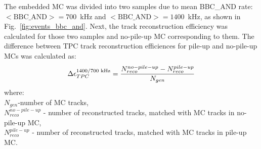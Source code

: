 \noindent The embedded MC was divided into two samples due to mean BBC\_AND rate: \mbox{$<\text{BBC\_AND}>=700$~kHz} and \mbox{$<\text{BBC\_AND}>=1400$~kHz}, as shown in Fig.~\ref{fig:events_bbc_and}. Next, the track reconstruction efficiency was calculated for those two samples and no-pile-up MC corresponding to them. The difference between TPC track reconstruction efficiences for pile-up and no-pile-up MCs was calculated as:
\begin{equation}
	\Delta\epsilon_{ TPC}^{1400/700\text{ kHz}} = \frac{N_{reco}^{no-pile-up}-N_{reco}^{pile-up}}{N_{gen}}\\
	\label{eq:tpcSyst}
\end{equation}
where:\\
$N_{gen}$-number of MC tracks,\\
$N_{reco}^{no-pile-up}$ - number of reconstructed tracks, matched with MC tracks in no-pile-up MC,\\
$N_{reco}^{pile-up}$ - number of reconstructed tracks, matched with MC tracks in pile-up MC.


